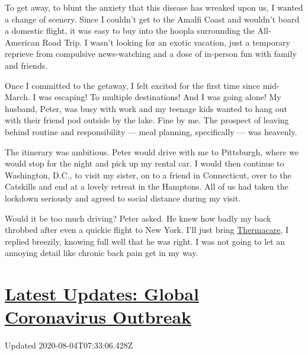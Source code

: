 To get away, to blunt the anxiety that this disease has wreaked upon us,
I wanted a change of scenery. Since I couldn't get to the Amalfi Coast
and wouldn't board a domestic flight, it was easy to buy into the hoopla
surrounding the All-American Road Trip. I wasn't looking for an exotic
vacation, just a temporary reprieve from compulsive news-watching and a
dose of in-person fun with family and friends.

Once I committed to the getaway, I felt excited for the first time since
mid-March. I was escaping! To multiple destinations! And I was going
alone! My husband, Peter, was busy with work and my teenage kids wanted
to hang out with their friend pod outside by the lake. Fine by me. The
prospect of leaving behind routine and responsibility --- meal planning,
specifically --- was heavenly.

The itinerary was ambitious. Peter would drive with me to Pittsburgh,
where we would stop for the night and pick up my rental car. I would
then continue to Washington, D.C., to visit my sister, on to a friend in
Connecticut, over to the Catskills and end at a lovely retreat in the
Hamptons. All of us had taken the lockdown seriously and agreed to
social distance during my visit.

Would it be too much driving? Peter asked. He knew how badly my back
throbbed after even a quickie flight to New York. I'll just bring
\href{https://www.thermacare.com/heat-wraps/back-pain-therapy}{Thermacare},
I replied breezily, knowing full well that he was right. I was not going
to let an annoying detail like chronic back pain get in my way.

\hypertarget{latest-updates-global-coronavirus-outbreak}{%
\section{\texorpdfstring{\href{https://www.nytimes.com/2020/08/03/world/coronavirus-covid-19.html?action=click\&pgtype=Article\&state=default\&region=MAIN_CONTENT_1\&context=storylines_live_updates}{Latest
Updates: Global Coronavirus
Outbreak}}{Latest Updates: Global Coronavirus Outbreak}}\label{latest-updates-global-coronavirus-outbreak}}

Updated 2020-08-04T07:33:06.428Z

